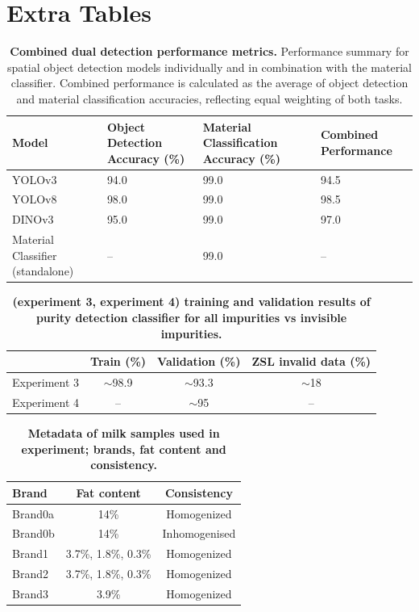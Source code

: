 \documentclass[12pt,a4paper,oneside]{report}
\let\oldchapter\chapter
\renewcommand{\chapter}{\thispagestyle{fancy}\oldchapter}
\begin{document}
\newpage
\chapter{Extra Tables}
\label{sec:extra_tables}

\begin{table}[H]
\centering
\footnotesize
\begin{tabularx}{\textwidth}{lX X X}
\hline
\textbf{Model} & \textbf{Object Detection Accuracy (\%)} & \textbf{Material Classification Accuracy (\%)} & \textbf{Combined Performance} \\
\hline
YOLOv3 & 94.0 & 99.0 & 94.5 \\
YOLOv8 & 98.0 & 99.0 & 98.5 \\
DINOv3 & 95.0 & 99.0 & 97.0 \\
Material Classifier (standalone) & -- & 99.0 & -- \\
\hline
\end{tabularx}
\caption[Combined dual detection performance metrics.]{\textbf{Combined dual detection performance metrics.} Performance summary for spatial object detection models individually and in combination with the material classifier. Combined performance is calculated as the average of object detection and material classification accuracies, reflecting equal weighting of both tasks.}
\label{tab:5_4}
\end{table}

\begin{table}[H]
\centering
\footnotesize
\begin{tabular}{lccc}
\hline
 & \textbf{Train (\%)} & \textbf{Validation (\%)} & \textbf{ZSL invalid data (\%)} \\
\hline
Experiment 3 & $\sim$98.9 & $\sim$93.3 & $\sim$18 \\
Experiment 4 & -- & $\sim$95 & -- \\
\hline
\end{tabular}
\caption[Training and validation results of purity detection classifier.]{\textbf{(experiment 3, experiment 4) training and validation results of purity detection classifier for all impurities vs invisible impurities.}}
\label{tab:6_3}
\end{table}

\begin{table}[H]
\centering
\footnotesize
\begin{tabular}{lcc}
\hline
\textbf{Brand} & \textbf{Fat content} & \textbf{Consistency} \\
\hline
Brand0a & 14\% & Homogenized \\
Brand0b & 14\% & Inhomogenised \\
Brand1 & 3.7\%, 1.8\%, 0.3\% & Homogenized \\
Brand2 & 3.7\%, 1.8\%, 0.3\% & Homogenized \\
Brand3 & 3.9\% & Homogenized \\
\hline
\end{tabular}
\caption[Metadata of milk samples used in experiment.]{\textbf{Metadata of milk samples used in experiment; brands, fat content and consistency.}}
\label{tab:6_4}
\end{table}
\end{document}

